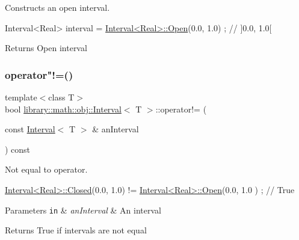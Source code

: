 Constructs an open interval. 


\begin{DoxyCode}
Interval<Real> interval = \hyperlink{classlibrary_1_1math_1_1obj_1_1_interval_add0e1114a0c153da7a928fd059a08919}{Interval<Real>::Open}(0.0, 1.0) ; \textcolor{comment}{// ]0.0, 1.0[}
\end{DoxyCode}


\begin{DoxyReturn}{Returns}
Open interval 
\end{DoxyReturn}
\mbox{\label{classlibrary_1_1math_1_1obj_1_1_interval_a5ca4c08ba0aff1ea42ea3804d51e02cf}} 
\subsubsection{\texorpdfstring{operator"!=()}{operator!=()}}
{\footnotesize\ttfamily template$<$class T$>$ \\
bool \hyperlink{classlibrary_1_1math_1_1obj_1_1_interval}{library\+::math\+::obj\+::\+Interval}$<$ T $>$\+::operator!= (\begin{DoxyParamCaption}\item[{const \hyperlink{classlibrary_1_1math_1_1obj_1_1_interval}{Interval}$<$ T $>$ \&}]{an\+Interval }\end{DoxyParamCaption}) const}



Not equal to operator. 


\begin{DoxyCode}
\hyperlink{classlibrary_1_1math_1_1obj_1_1_interval_aae8bb2b89af450729338d48563def4d7}{Interval<Real>::Closed}(0.0, 1.0) != \hyperlink{classlibrary_1_1math_1_1obj_1_1_interval_add0e1114a0c153da7a928fd059a08919}{Interval<Real>::Open}(0.0, 1.0
      ) ; \textcolor{comment}{// True}
\end{DoxyCode}



\begin{DoxyParams}[1]{Parameters}
\mbox{\tt in}  & {\em an\+Interval} & An interval \\
\hline
\end{DoxyParams}
\begin{DoxyReturn}{Returns}
True if intervals are not equal 
\end{DoxyReturn}
\mbox{\label{classlibrary_1_1math_1_1obj_1_1_interval_a99b12768e33b75bf87ab656b92c03e98}} 
